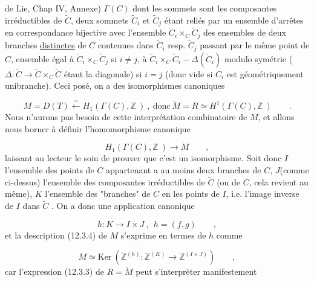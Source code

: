 de Lie, Chap IV, Annexe) $\Gamma(C)$ dont les sommets sont les composantes irréductibles de $\widetilde{C}$, deux sommets $\widetilde{C}_i$ et $\widetilde{C}_j$ étant reliés par un ensemble d'arrêtes en correspondance bijective avec l'ensemble $\widetilde{C}_i \times_C \widetilde{C}_j$ des ensembles de deux branches \underline{distinctes} de $C$ contenues dans $\widetilde{C}_i$ resp. $\widetilde{C}_j$ passant par le même point de $C$, ensemble égal à $\widetilde{C}_i \times_C \widetilde{C}_j$ si $i \neq j$, à $\widetilde{C}_i \times_C \widetilde{C}_i - \Delta(\widetilde{C}_i)$ modulo symétrie ($\Delta : \widetilde{C} \longrightarrow \widetilde{C} \times_C \widetilde{C}$ étant la diagonale) si $i=j$ (donc vide si $C_i$ est géométriquement unibranche). Ceci posé, on a des isomorphismes canoniques

\begin{equation}\tag{12.3.7}
M = D(T) \stackrel{\sim}{\longleftarrow} H_1(\Gamma(C),\mathbb{Z}\ )\ ,\ \mbox{donc}\ \check{M} = R \simeq H^{1}(\Gamma(C),\mathbb{Z}\ )\qquad .
\end{equation}
Nous n'aurons pas besoin de cette interprétation combinatoire de $M$, et allons nous borner à définir l'homomorphisme canonique

\begin{equation*}
H_1(\Gamma(C),\mathbb{Z}\ ) \longrightarrow M \qquad ,
\end{equation*}
laissant au lecteur le soin de prouver que c'est un isomorphisme. Soit donc $I$ l'ensemble des points de $C$ appartenant a au moins deux branches de $C$, $J$(comme ci-dessus) l'ensemble des composantes irréductibles de $\widetilde{C}$ (ou de $C$, cela revient au même), $K$ l'ensemble des "branches" de $C$ en les points de $I$, i.e. l'image inverse de $I$ dans $\widetilde{C}$ . On a donc une application canonique

\begin{equation}\tag{12.3.9}
h : K \longrightarrow I \times J\ ,\ \ h = (f,g)\qquad ,
\end{equation}
et la description (12.3.4) de $M$ s'exprime en termes de $h$ comme

\begin{equation}\tag{12.3.10}
M \simeq \mathrm{Ker}\ (\mathbb{Z}^{(h)} : \mathbb{Z}^{(K)} \longrightarrow \mathbb{Z}^{(I \times J)})\qquad ,
\end{equation}
car l'expression (12.3.3) de $R = \check{M}$ peut s'interprèter manifestement



